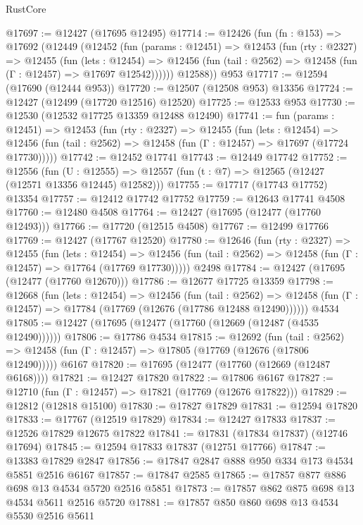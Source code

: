 \begin{lexlean}{RustCore}
\begin{coremodule}
@17697 := @12427 (@17695 @12495)
@17714 := @12426
    (fun (fn : @153) =>
    @17692
      (@12449
        (@12452
          (fun (params : @12451) =>
          @12453
            (fun (rty : @2327) =>
            @12455
              (fun (lets : @12454) =>
              @12456 (fun (tail : @2562) => @12458 (fun (Γ : @12457) => @17697 @12542))))))
        @12588))
    @953
@17717 := @12594 (@17690 (@12444 @953))
@17720 := @12507 (@12508 @953) @13356
@17724 := @12427 (@12499 (@17720 @12516) @12520)
@17725 := @12533 @953
@17730 := @12530 (@12532 @17725 @13359 @12488 @12490)
@17741 := fun (params : @12451) =>
  @12453
    (fun (rty : @2327) =>
    @12455
      (fun (lets : @12454) =>
      @12456 (fun (tail : @2562) => @12458 (fun (Γ : @12457) => @17697 (@17724 @17730)))))
@17742 := @12452 @17741
@17743 := @12449 @17742
@17752 := @12556
    (fun (U : @12555) => @12557 (fun (t : @7) => @12565 (@12427 (@12571 @13356 @12445) @12582)))
@17755 := @17717 (@17743 @17752) @13354
@17757 := @12412 @17742 @17752
@17759 := @12643 @17741 @4508
@17760 := @12480 @4508
@17764 := @12427 (@17695 (@12477 (@17760 @12493)))
@17766 := @17720 (@12515 @4508)
@17767 := @12499 @17766
@17769 := @12427 (@17767 @12520)
@17780 := @12646
    (fun (rty : @2327) =>
    @12455
      (fun (lets : @12454) =>
      @12456 (fun (tail : @2562) => @12458 (fun (Γ : @12457) => @17764 (@17769 @17730)))))
    @2498
@17784 := @12427 (@17695 (@12477 (@17760 @12670)))
@17786 := @12677 @17725 @13359
@17798 := @12668
    (fun (lets : @12454) =>
    @12456
      (fun (tail : @2562) =>
      @12458 (fun (Γ : @12457) => @17784 (@17769 (@12676 (@17786 @12488 @12490))))))
    @4534
@17805 := @12427 (@17695 (@12477 (@17760 (@12669 (@12487 (@4535 @12490))))))
@17806 := @17786 @4534
@17815 := @12692
    (fun (tail : @2562) => @12458 (fun (Γ : @12457) => @17805 (@17769 (@12676 (@17806 @12490)))))
    @6167
@17820 := @17695 (@12477 (@17760 (@12669 (@12487 @6168))))
@17821 := @12427 @17820
@17822 := @17806 @6167
@17827 := @12710 (fun (Γ : @12457) => @17821 (@17769 (@12676 @17822)))
@17829 := @12812 (@12818 @15100)
@17830 := @17827 @17829
@17831 := @12594 @17820
@17833 := @17767 (@12519 @17829)
@17834 := @12427 @17833
@17837 := @12526 @17829 @12675 @17822
@17841 := @17831 (@17834 @17837) (@12746 @17694)
@17845 := @12594 @17833 @17837 (@12751 @17766)
@17847 := @13383 @17829 @2847
@17856 := @17847 @2847 @888 @950 @334 @173 @4534 @5851 @2516 @6167
@17857 := @17847 @2585
@17865 := @17857 @877 @886 @698 @13 @4534 @5720 @2516 @5851
@17873 := @17857 @862 @875 @698 @13 @4534 @5611 @2516 @5720
@17881 := @17857 @850 @860 @698 @13 @4534 @5530 @2516 @5611

\end{coremodule}
\end{lexlean}
